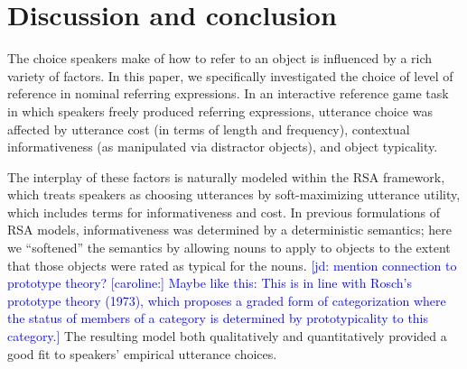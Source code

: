 \documentclass[10pt,letterpaper]{article}
\newcommand{\jd}[1]{\textcolor{Blue}{[jd: #1]}}
\newcommand{\ndg}[1]{\textcolor{Green}{[ndg: #1]}}
\begin{document}
\section{\bf Discussion and conclusion}


The choice speakers make of how to refer to an object is influenced by a rich variety of factors.
In this paper, we specifically investigated the choice of level of reference in nominal referring expressions. In an interactive reference game task in which speakers freely produced referring expressions, utterance choice was affected by utterance cost (in terms of length and frequency), contextual informativeness (as manipulated via distractor objects), and object typicality.

The interplay of these factors is naturally modeled within the RSA framework, which treats speakers as choosing utterances by soft-maximizing utterance utility, which includes terms for informativeness and cost. In previous formulations of RSA models, informativeness was determined by a deterministic semantics; here we ``softened'' the semantics by allowing nouns to apply to objects to the extent that those objects were rated as typical for the nouns. \jd{mention connection to prototype theory? [caroline:] Maybe like this: This is in line with Rosch's prototype theory (1973), which proposes a graded form of categorization where the status of members of a category is determined by prototypicality to this category.} 
 The resulting model both qualitatively and quantitatively provided a good fit to speakers' empirical utterance choices. 



\end{document}
